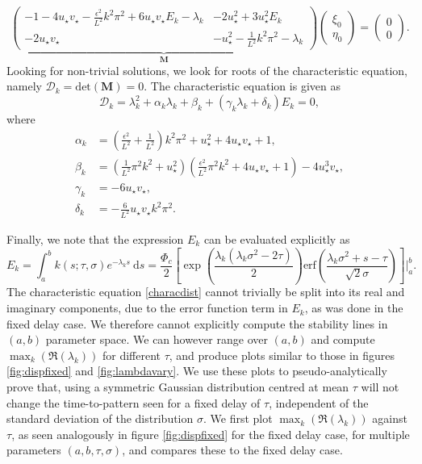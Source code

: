 \begin{equation}
\underbrace{\begin{pmatrix}-1-4u_\star v_\star-\frac{\epsilon^2}{L^2}k^2\pi^2+6u_\star v_\star E_k-\lambda_k&-2u_\star^2+3u_\star^2E_k\\-2u_\star v_\star&-u_\star^2-\frac{1}{L^2}k^2\pi^2-\lambda_k \end{pmatrix}}_{\textbf{M}}\begin{pmatrix}\xi_0\\\eta_0\end{pmatrix}=\begin{pmatrix}0\\0\end{pmatrix}.
\end{equation}
Looking for non-trivial solutions, we look for roots of the characteristic equation, namely $\mathcal{D}_k=\text{det}(\textbf{M})=0$. The characteristic equation is given as
\begin{equation}\label{characdist}
  \mathcal{D}_k=\lambda_k^2+\alpha_k\lambda_k+\beta_k+(\gamma_k\lambda_k+\delta_k)E_k=0,
\end{equation}
where
\begin{equation}\label{characcoeff}
    \begin{split}
\alpha_k&=\left(\frac{\epsilon^2}{L^2}+\frac{1}{L^2}\right)k^2\pi^2+u_\star^2+4u_\star v_\star+1,\\
\beta_k&=\left(\frac{1}{L^2}\pi^2k^2+u_\star^2\right)\left(\frac{\epsilon^2}{L^2}\pi^2k^2+4u_\star v_\star+1\right)-4u_\star^3v_\star,\\
\gamma_k&=-6u_\star v_\star,\\
\delta_k&=-\frac{6}{L^2}u_\star v_\star k^2\pi^2.
\end{split}
\end{equation}

Finally, we note that the expression $E_k$ can be evaluated explicitly as
\begin{equation}
E_k=\int_a^bk(s;\tau,\sigma)e^{-\lambda_k s}\ \text{d}s=\frac{\Phi_c}{2}\left[\exp\left(\frac{\lambda_k(\lambda_k\sigma^2-2\tau)}{2}\right) \text{erf} \left(\frac{\lambda_k\sigma^2+s-\tau}{\sqrt{2}\sigma}\right)\right]\Bigg|_a^b.
\end{equation}
The characteristic equation \eqref{characdist} cannot trivially be split into its real and imaginary components, due to the error function term in $E_k$, as was done in the fixed delay case. We therefore cannot explicitly compute the stability lines in $(a,b)$ parameter space. We can however range over $(a,b)$ and compute $\max_k(\Re(\lambda_k))$ for different $\tau$, and produce plots similar to those in figures \ref{fig:dispfixed} and \ref{fig:lambdavary}. We use these plots to pseudo-analytically prove that, using a symmetric Gaussian distribution centred at mean $\tau$ will not change the time-to-pattern seen for a fixed delay of $\tau$, independent of the standard deviation of the distribution $\sigma$. We first plot $\max_k(\Re(\lambda_k))$ against $\tau$, as seen analogously in figure \ref{fig:dispfixed} for the fixed delay case, for multiple parameters $(a,b,\tau,\sigma)$, and compares these to the fixed delay case.

